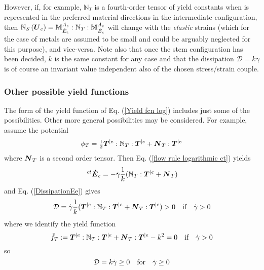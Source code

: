 \documentclass[preprint,review,12pt,sort&compress]{elsarticle}%
\renewcommand{\mathbf}[1]{\mbox{\boldmath $#1$ \unboldmath}  \!\!}
\begin{document}
However, if, for example, $\mathbb{N}_{T}$ is a fourth-order tensor of yield
constants when is represented in the preferred material directions in the
intermediate configuration, then $\mathbb{N}_{S}\left(  \mathbf{U}_{e}\right)
=\mathbb{M}_{\dot{E}_{e}}^{\dot{A}_{e}}:\mathbb{N}_{T}:\mathbb{M}_{\dot{E}%
_{e}}^{\dot{A}_{e}}$ will change with the \emph{elastic} strains (which for
the case of metals are assumed to be small and could be arguably neglected for
this purpose), and vice-versa. Note also that once the stem configuration has
been decided, $k$ is the same constant for any case and that the dissipation
$\mathcal{D}=k\dot{\gamma}$ is of course an invariant value independent also
of the chosen stress/strain couple.

\subsubsection{Other possible yield functions}

The form of the yield function of Eq. (\ref{Yield fcn log}) includes just some
of the possibilities. Other more general possibilities may be considered. For
example, assume the potential%
\begin{equation}
\phi_{T}=\tfrac{1}{2}\mathbf{T}^{|e}:\mathbb{N}_{T}:\mathbf{T}^{|e}%
+\mathbf{N}_{T}:\mathbf{T}^{|e}%
\end{equation}
where $\mathbf{N}_{T}$ is a second order tensor. Then Eq.
(\ref{flow rule logarithmic ct}) yields%
\begin{equation}
\,^{ct}\mathbf{\dot{E}}_{e}=-\dot{\gamma}\frac{1}{k}(\mathbb{N}_{T}%
:\mathbf{T}^{|e}+\mathbf{N}_{T})
\end{equation}
and Eq. (\ref{DissipationEe}) gives%
\begin{equation}
\mathcal{D}=\dot{\gamma}\frac{1}{k}(\mathbf{T}^{|e}:\mathbb{N}_{T}%
:\mathbf{T}^{|e}+\mathbf{N}_{T}:\mathbf{T}^{|e})>0\quad\text{if}\quad
\dot{\gamma}>0
\end{equation}
where we identify the yield function%
\begin{equation}
\bar{f}_{T}:=\mathbf{T}^{|e}:\mathbb{N}_{T}:\mathbf{T}^{|e}+\mathbf{N}%
_{T}:\mathbf{T}^{|e}-k^{2}=0\quad\text{if}\quad\dot{\gamma}>0
\end{equation}
so%
\begin{equation}
\mathcal{D}=k\dot{\gamma}\geq0\text{\quad for\quad}\dot{\gamma}\geq0
\end{equation}
\end{document}
